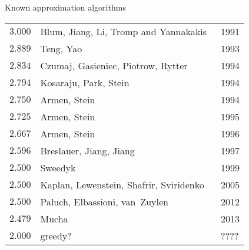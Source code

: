 %
%    
%    
%    
%    
%	
%	
%		
%		
%		
%	
%	
%	

\begin{frame}{Known approximation algorithms}
\small
\begin{tabular}{lll}
$3.000$ & Blum, Jiang, Li, Tromp and Yannakakis~ & 1991\\
$2.889$ & Teng, Yao & 1993\\
$2.834$ & Czumaj, Gasieniec, Piotrow, Rytter~ & 1994\\
$2.794$ & Kosaraju, Park, Stein & 1994\\
$2.750$ & Armen, Stein & 1994\\
$2.725$ & Armen, Stein & 1995\\
$2.667$ & Armen, Stein & 1996\\
$2.596$ & Breslauer, Jiang, Jiang & 1997\\
$2.500$ & Sweedyk & 1999\\
$2.500$ & Kaplan, Lewenstein, Shafrir, Sviridenko & 2005\\
$2.500$ & Paluch, Elbassioni, van~Zuylen~ & 2012\\
$2.479$ & Mucha & 2013\\
\pause
\alert{$2.000$} & \alert{greedy?} & \alert{????}
\end{tabular}
\end{frame}

